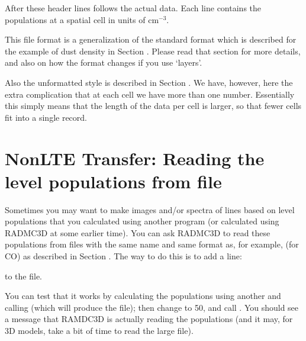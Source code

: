 \documentclass[letterpaper,10pt,english]{sphinxmanual}
\begin{document}
After these header lines follows the actual data. Each line contains the
populations at a spatial cell in units of \(\mathrm{cm}^{-3}\).

This file format is a generalization of the standard format which is
described for the example of dust density in Section {\hyperref[\detokenize{inputoutputfiles:sec-dustdens}]{}}.
Please read that section for more details, and also on how the format
changes if you use ‘layers’.

Also the unformatted style is described in Section {\hyperref[\detokenize{inputoutputfiles:sec-dustdens}]{}}. We
have, however, here the extra complication that at each cell we have more
than one number. Essentially this simply means that the length of the data
per cell is larger, so that fewer cells fit into a single record.


\section{Non\sphinxhyphen{}LTE Transfer: Reading the level populations from file}
\label{\detokenize{lineradtrans:non-lte-transfer-reading-the-level-populations-from-file}}\label{\detokenize{lineradtrans:sec-nonlte-read-levelpop}}
Sometimes you may want to make images and/or spectra of lines based on level
populations that you calculated using another program (or calculated using
RADMC\sphinxhyphen{}3D at some earlier time). You can ask RADMC\sphinxhyphen{}3D to read these
populations from files with the same name and same format as, for example,
 (for CO) as described in Section
{\hyperref[\detokenize{lineradtrans:sec-nonlte-write-levelpop}]{}}. The way to do this is to add a line:

\begin{sphinxVerbatim}[commandchars=\\\{\}]
  
\end{sphinxVerbatim}

to the  file.

You can test that it works by calculating the populations using another
 and calling  (which will produce the
 file); then change  to 50, and call . You should see a message that RAMDC\sphinxhyphen{}3D is actually reading the
populations (and it may, for 3\sphinxhyphen{}D models, take a bit of time to read the large
file).
\end{document}
